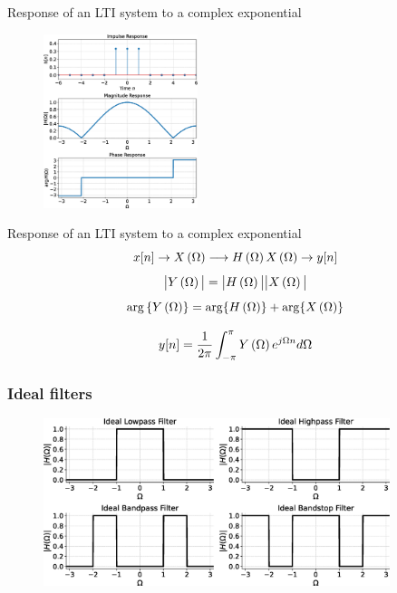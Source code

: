 \documentclass[aspectratio=169]{beamer}
\def\lp{\ensuremath\left(}
\def\rp{\ensuremath\right)}
\begin{document}
\begin{frame}[t]{Response of an LTI system to a complex exponential}
  \begin{center}
  \begin{figure}
  \centering
  \includegraphics[width=0.4\textwidth]{img/movavg.eps}
  \end{figure}
  \end{center}
\end{frame}


\begin{frame}[t]{Response of an LTI system to a complex exponential}
\[ x[n] \rightarrow X\lp \Omega \rp \longrightarrow H\lp \Omega \rp X\lp \Omega \rp \rightarrow y[n]\]
\[ \big \vert Y\lp \Omega \rp \big \vert = \big \vert H\lp \Omega \rp\big \vert \big \vert X\lp \Omega \rp\big \vert \]
\[ \arg  \, \{ Y\lp \Omega \rp \} = \arg \{ H\lp \Omega \rp \} + \arg \{ X\lp \Omega \rp \} \]

\[ y[n] = \frac{1}{2\pi} \int_{-\pi}^{\pi} Y\lp \Omega \rp e^{j\Omega n} d\Omega \]
\end{frame}


\begin{frame}[t]
  \frametitle{Ideal filters}
  \begin{center}
  \begin{figure}
  \centering
  \includegraphics[width=0.9\textwidth]{img/idealfilt.eps}
  \end{figure}
  \end{center}
\end{frame}
\end{document}
